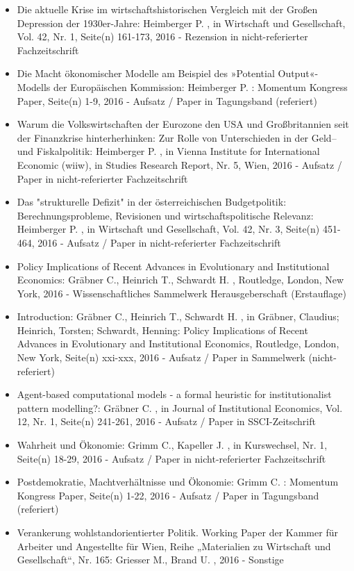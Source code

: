 \begin{itemize}
	 \item Die aktuelle Krise im wirtschaftshistorischen Vergleich mit der Großen Depression der 1930er-Jahre: Heimberger P. , in Wirtschaft und Gesellschaft, Vol. 42, Nr. 1, Seite(n) 161-173, 2016 - Rezension in nicht-referierter Fachzeitschrift
	 \item Die Macht ökonomischer Modelle am Beispiel des »Potential Output«-Modells der Europäischen Kommission: Heimberger P. : Momentum Kongress Paper, Seite(n) 1-9, 2016 - Aufsatz / Paper in Tagungsband (referiert)
	 \item Warum die Volkswirtschaften der Eurozone den USA und Großbritannien seit der Finanzkrise hinterherhinken: Zur Rolle von Unterschieden in der Geld– und Fiskalpolitik: Heimberger P. , in Vienna Institute for International Economic (wiiw), in Studies Research Report, Nr. 5, Wien, 2016 - Aufsatz / Paper in nicht-referierter Fachzeitschrift
	 \item Das "strukturelle Defizit" in der österreichischen Budgetpolitik: Berechnungsprobleme, Revisionen und wirtschaftspolitische Relevanz: Heimberger P. , in Wirtschaft und Gesellschaft, Vol. 42, Nr. 3, Seite(n) 451-464, 2016 - Aufsatz / Paper in nicht-referierter Fachzeitschrift
	 \item Policy Implications of Recent Advances in Evolutionary and Institutional Economics: Gräbner C., Heinrich T., Schwardt H. , Routledge, London, New York, 2016 - Wissenschaftliches Sammelwerk Herausgeberschaft (Erstauflage)
	 \item Introduction: Gräbner C., Heinrich T., Schwardt H. , in Gräbner, Claudius; Heinrich, Torsten; Schwardt, Henning: Policy Implications of Recent Advances in Evolutionary and Institutional Economics, Routledge, London, New York, Seite(n) xxi-xxx, 2016 - Aufsatz / Paper in Sammelwerk (nicht-referiert)
	 \item Agent-based computational models - a formal heuristic for institutionalist pattern modelling?: Gräbner C. , in Journal of Institutional Economics, Vol. 12, Nr. 1, Seite(n) 241-261, 2016 - Aufsatz / Paper in SSCI-Zeitschrift
	 \item Wahrheit und Ökonomie: Grimm C., Kapeller J. , in Kurswechsel, Nr. 1, Seite(n) 18-29, 2016 - Aufsatz / Paper in nicht-referierter Fachzeitschrift
	 \item Postdemokratie, Machtverhältnisse und Ökonomie: Grimm C. : Momentum Kongress Paper, Seite(n) 1-22, 2016 - Aufsatz / Paper in Tagungsband (referiert)
	 \item Verankerung wohlstandorientierter Politik. Working Paper der Kammer für Arbeiter und Angestellte für Wien, Reihe „Materialien zu Wirtschaft und Gesellschaft“, Nr. 165: Griesser M., Brand U. , 2016 - Sonstige

\end{itemize}
